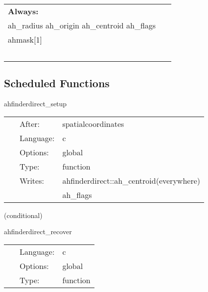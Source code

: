  \begin{tabular*}{160mm}{ll} 

{\bf Always:}&  ~ \\ 
 ah\_radius ah\_origin ah\_centroid ah\_flags & ~\\ 
 ahmask[1] & ~\\ 
~ & ~\\ 
\end{tabular*} 


\subsection*{Scheduled Functions}
\vspace{5mm}


\hspace{5mm} ahfinderdirect\_setup 

\hspace{5mm}{\it setup data structures } 


\hspace{5mm}

 \begin{tabular*}{160mm}{cll} 
~ & After:  & spatialcoordinates \\ 
~ & Language:  & c \\ 
~ & Options:  & global \\ 
~ & Type:  & function \\ 
~ & Writes:  & ahfinderdirect::ah\_centroid(everywhere) \\ 
~& ~ &ah\_flags\\ 
\end{tabular*} 


\vspace{5mm}

   (conditional) 

\hspace{5mm} ahfinderdirect\_recover 

\hspace{5mm}{\it import horizon data from cactus variables } 


\hspace{5mm}

 \begin{tabular*}{160mm}{cll} 
~ & Language:  & c \\ 
~ & Options:  & global \\ 
~ & Type:  & function \\ 
\end{tabular*} 


